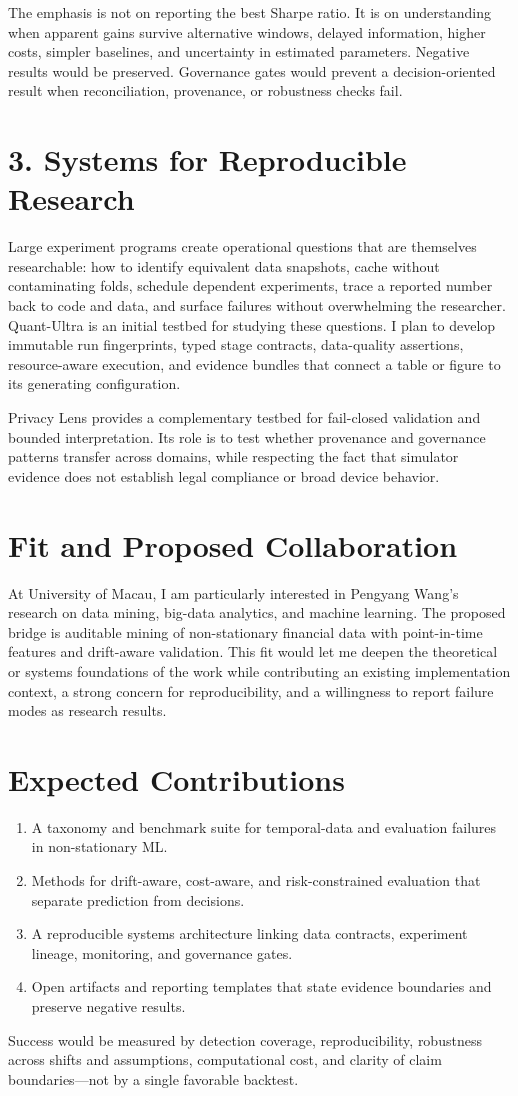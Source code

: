 \documentclass[11pt]{article}
\begin{document}
The emphasis is not on reporting the best Sharpe ratio. It is on understanding when apparent gains survive alternative windows, delayed information, higher costs, simpler baselines, and uncertainty in estimated parameters. Negative results would be preserved. Governance gates would prevent a decision-oriented result when reconciliation, provenance, or robustness checks fail.

\section*{3. Systems for Reproducible Research}
Large experiment programs create operational questions that are themselves researchable: how to identify equivalent data snapshots, cache without contaminating folds, schedule dependent experiments, trace a reported number back to code and data, and surface failures without overwhelming the researcher. Quant-Ultra is an initial testbed for studying these questions. I plan to develop immutable run fingerprints, typed stage contracts, data-quality assertions, resource-aware execution, and evidence bundles that connect a table or figure to its generating configuration.

Privacy Lens provides a complementary testbed for fail-closed validation and bounded interpretation. Its role is to test whether provenance and governance patterns transfer across domains, while respecting the fact that simulator evidence does not establish legal compliance or broad device behavior.

\section*{Fit and Proposed Collaboration}
At University of Macau, I am particularly interested in Pengyang Wang's research on data mining, big-data analytics, and machine learning. The proposed bridge is auditable mining of non-stationary financial data with point-in-time features and drift-aware validation. This fit would let me deepen the theoretical or systems foundations of the work while contributing an existing implementation context, a strong concern for reproducibility, and a willingness to report failure modes as research results.

\section*{Expected Contributions}
\begin{enumerate}
\item A taxonomy and benchmark suite for temporal-data and evaluation failures in non-stationary ML.
\item Methods for drift-aware, cost-aware, and risk-constrained evaluation that separate prediction from decisions.
\item A reproducible systems architecture linking data contracts, experiment lineage, monitoring, and governance gates.
\item Open artifacts and reporting templates that state evidence boundaries and preserve negative results.
\end{enumerate}

Success would be measured by detection coverage, reproducibility, robustness across shifts and assumptions, computational cost, and clarity of claim boundaries---not by a single favorable backtest.
\end{document}
